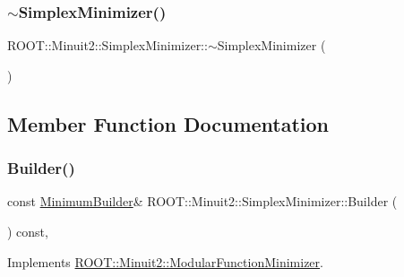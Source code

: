 \mbox{\label{classROOT_1_1Minuit2_1_1SimplexMinimizer_a52f955e2ed5e48a5816300d1c82c4841}} 
\subsubsection{\texorpdfstring{$\sim$SimplexMinimizer()}{~SimplexMinimizer()}\hspace{0.1cm}{\footnotesize\ttfamily [3/3]}}
{\footnotesize\ttfamily R\+O\+O\+T\+::\+Minuit2\+::\+Simplex\+Minimizer\+::$\sim$\+Simplex\+Minimizer (\begin{DoxyParamCaption}{ }\end{DoxyParamCaption})\hspace{0.3cm}{\ttfamily [inline]}}



\subsection{Member Function Documentation}
\mbox{\label{classROOT_1_1Minuit2_1_1SimplexMinimizer_a388494c3f9b45ce6c5d91decef737608}} 
\subsubsection{\texorpdfstring{Builder()}{Builder()}\hspace{0.1cm}{\footnotesize\ttfamily [1/3]}}
{\footnotesize\ttfamily const \mbox{\hyperlink{classROOT_1_1Minuit2_1_1MinimumBuilder}{Minimum\+Builder}}\& R\+O\+O\+T\+::\+Minuit2\+::\+Simplex\+Minimizer\+::\+Builder (\begin{DoxyParamCaption}{ }\end{DoxyParamCaption}) const\hspace{0.3cm}{\ttfamily [inline]}, {\ttfamily [virtual]}}



Implements \mbox{\hyperlink{classROOT_1_1Minuit2_1_1ModularFunctionMinimizer_a13e98551cf14e927c61e1e34ecf8ba8b}{R\+O\+O\+T\+::\+Minuit2\+::\+Modular\+Function\+Minimizer}}.

